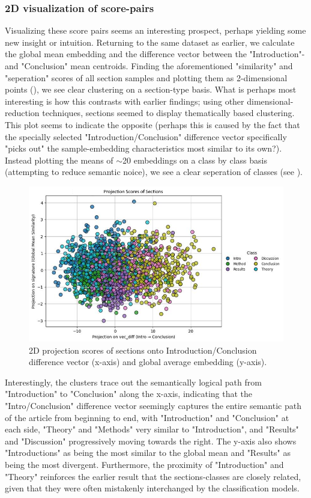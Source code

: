 \subsubsection{2D visualization of score-pairs}
Visualizing these score pairs seems an interesting prospect, perhaps yielding some new insight or intuition. Returning to the same dataset as earlier, we calculate the global mean embedding and the difference vector between the "Introduction"- and "Conclusion" mean centroids. Finding the aforementioned "similarity" and "seperation" scores of all section samples and plotting them as 2-dimensional points (), we see clear clustering on a section-type basis. What is perhaps most interesting is how this contrasts with earlier findings; using other dimensional-reduction techniques, sections seemed to display thematically based clustering. This plot seems to indicate the opposite (perhaps this is caused by the fact that the specially selected "Introduction/Conclusion" difference vector specifically "picks out" the sample-embedding characteristics most similar to its own?). Instead plotting the means of $\sim$20 embeddings on a class by class basis (attempting to reduce semantic noice), we see a clear seperation of classes (see ). 

\begin{figure}%
    \centering
    \includegraphics[width=.8\linewidth]{media/section_projections.png}
    \caption{2D projection scores of sections onto Introduction/Conclusion difference vector (x-axis) and global average embedding (y-axis).}
    \label{fig:107}
\end{figure}


Interestingly, the clusters trace out the semantically logical path from "Introduction" to "Conclusion" along the x-axis, indicating that the "Intro/Conclusion" difference vector seemingly captures the entire semantic path of the article from beginning to end, with "Introduction" and "Conclusion" at each side, "Theory" and "Methods" very similar to "Introduction", and "Results" and "Discussion" progressively moving towards the right. The y-axis also shows "Introductions" as being the most similar to the global mean and "Results" as being the most divergent. Furthermore, the proximity of "Introduction" and "Theory" reinforces the earlier result that the sections-classes are closely related, given that they were often mistakenly interchanged by the classification models.

